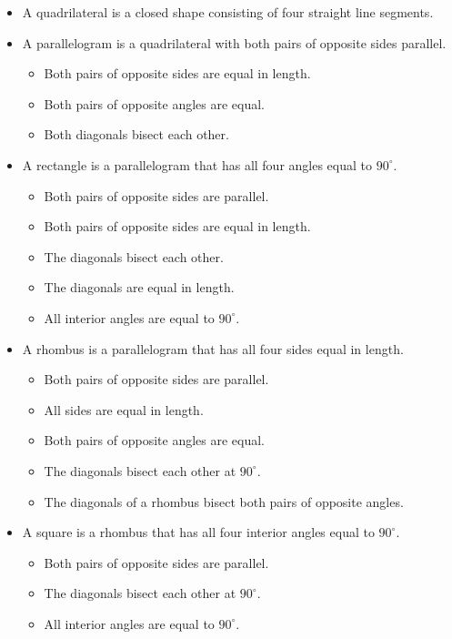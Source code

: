 \begin{itemize}[noitemsep]
\item A quadrilateral is a closed shape consisting of four straight line segments.
\item A parallelogram is a quadrilateral with both pairs of opposite sides parallel.
  \begin{itemize}[noitemsep]
  \item Both pairs of opposite sides are equal in length.
  \item Both pairs of opposite angles are equal.
  \item Both diagonals bisect each other.
  \end{itemize}
\item A rectangle is a parallelogram that has all four angles equal to $90^\circ$.
  \begin{itemize}[noitemsep]
  \item Both pairs of opposite sides are parallel.
  \item Both pairs of opposite sides are equal in length.
  \item The diagonals bisect each other.
  \item The diagonals are equal in length.
  \item All interior angles are equal to $90^{\circ}$.
  \end{itemize}
\item A rhombus is a parallelogram that has all four sides equal in length.
  \begin{itemize}[noitemsep]
  \item Both pairs of opposite sides are parallel.
  \item All sides are equal in length.
  \item Both pairs of opposite angles are equal.
  \item The diagonals bisect each other at $90^\circ$.
  \item The diagonals of a rhombus bisect both pairs of opposite angles.
  \end{itemize}
\item A square is a rhombus that has all four interior angles equal to $90^\circ$.
  \begin{itemize}[noitemsep]
\item Both pairs of opposite sides are parallel.
  \item The diagonals bisect each other at $90^\circ$.
  \item All interior angles are equal to $90^\circ$.


\end{itemize}
\end{itemize}
